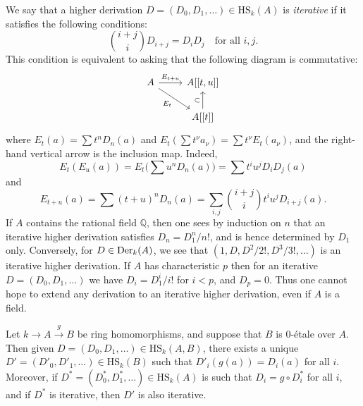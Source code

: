 We say that a higher derivation $D = (D_0, D_1, \ldots) \in \mathrm{HS}_k(A)$ is \emph{iterative} if
it satisfies the following conditions:
\[
  \binom{i+j}{i}D_{i+j} = D_iD_j \quad \text{for all } i, j.
\]
This condition is equivalent to asking that the following diagram is commutative:
\[
\begin{tikzcd}
A \arrow[r, "E_{t+u}"] \arrow[rd, "E_t"'] & A[[t, u]] \\
& A[[t]] \arrow[u, "\subset"]
\end{tikzcd}
\]
where $E_t(a) = \sum t^nD_n(a)$ and $E_t(\sum t^\nu a_\nu) = \sum t^\nu E_t(a_\nu)$, and the
right-hand vertical arrow is the inclusion map. Indeed,
\[
  E_t(E_u(a)) = E_t\Big(\sum u^nD_n(a)\Big) = \sum t^i u^j D_iD_j(a)
\]
and
\[
  E_{t+u}(a) = \sum (t + u)^nD_n(a) = \sum_{i,j} \binom{i+j}{i} t^i u^j D_{i+j}(a).
\]
If $A$ contains the rational field $\mathbb{Q}$, then one sees by induction on $n$ that an
iterative higher derivation satisfies $D_n = D_1^n/n!$, and is hence determined by
$D_1$ only. Conversely, for $D \in \operatorname{Der}_k(A)$, we see that
$(1, D, D^2/2!, D^3/3!, \ldots)$ is an iterative higher derivation. If $A$ has
characteristic $p$ then for an iterative $D = (D_0, D_1, \ldots)$ we have $D_i = D_1^i/i!$
for $i < p$, and $D_p = 0$. Thus one cannot hope to extend any derivation to an
iterative higher derivation, even if $A$ is a field.

\begin{theorem}\label{thm:27.2}
Let $k \to A \xrightarrow{g} B$ be ring homomorphisms, and suppose that $B$ is 0-\'etale over
$A$. Then given $D = (D_0, D_1, \ldots) \in \mathrm{HS}_k(A, B)$, there exists a unique
$D' = (D'_0, D'_1, \ldots) \in \mathrm{HS}_k(B)$ such that $D'_i(g(a)) = D_i(a)$ for all $i$.
Moreover, if $D^* = (D_0^*, D_1^*, \ldots) \in \mathrm{HS}_k(A)$ is such that $D_i = g \circ D_i^*$
for all $i$, and if $D^*$ is iterative, then $D'$ is also iterative.
\end{theorem}

